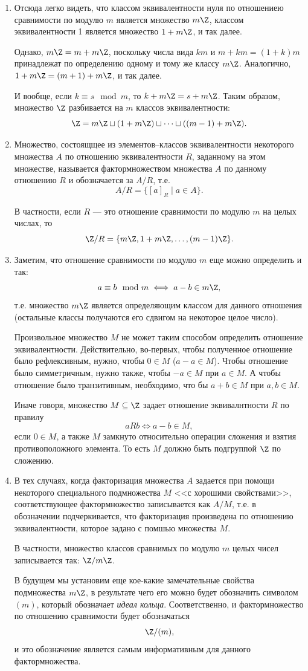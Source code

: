\begin{enumerate}
\item Отсюда легко видеть, что классом эквивалентности нуля по отношениею сравнимости по модулю $m$ является множество $m\Z$, классом эквивалентности 1 является множество $1+m\Z$, и так далее.

Однако, $m\Z=m+m\Z$, поскольку числа вида $km$ и $m+km=(1+k)m$ принадлежат по определению одному и тому же классу $m\Z$. Аналогично, $1+m\Z=(m+1)+m\Z$, и так далее.

И вообще, если $k\equiv s\mod m$, то $k+m\Z=s+m\Z$. Таким образом, множество $\Z$ разбивается на $m$ классов эквивалентности:
$$
\Z = m\Z \sqcup (1+m\Z) \sqcup\dots \sqcup ((m-1)+m\Z).
$$

\item Множество, состоящщее из элементов--классов эквивалентности некоторого множества $A$ по отношению эквивалентности $R$, заданному на этом множестве, называется фактормножеством множества $A$ по данному отношению $R$ и обозначается за $A/R$, т.е.
$$
A/R = \{[a]_R\mid a\in A\}.
$$

В частности, если $R$ --- это отношение сравнимости по модулю $m$ на целых числах, то
$$
\Z/R = \{m\Z, 1+m\Z,\dots,(m-1)\Z\}.
$$

\item Заметим, что отношение сравнимости по модулю $m$ еще можно определить и так:
$$
a\equiv b\mod m\iff a-b\in m\Z,
$$
т.е. множество $m\Z$ является определяющим классом для данного отношения (остальные классы получаются его сдвигом на некоторое целое число).

Произвольное множество $M$ не может таким способом определить отношение эквивалентности. Действительно, во-первых, чтобы полученное отношение было рефлексивным, нужно, чтобы $0\in M$ ($a-a\in M$). Чтобы отношение было симметричным, нужно также, чтобы $-a\in M$ при $a\in M$. А чтобы отношение было транзитивным, необходимо, что бы $a+b\in M$ при $a,b\in M$.

Иначе говоря, множество $M\subseteq \Z$ задает отношение эквивалнтности $R$ по правилу
$$
aRb\iff a-b\in M,
$$
если $0\in M$, а также $M$ замкнуто относительно операции сложения и взятия противоположного элемента. То есть $M$ должно быть подгруппой $\Z$ по сложению.

\item В тех случаях, когда факторизация множества $A$ задается при помощи некоторого специального подмножества $M$ <<с хорошими свойствами>>, соответствующее фактормножество записывается как $A/M$, т.е. в обозначении подчеркивается, что факторизация произведена по отношению эквивалентности, которое задано с помшью множества $M$.

В частности, множество классов сравнимых по модулю $m$ целых чисел записывается так: $\Z/m\Z$.

В будущем мы установим еще кое-какие замечательные свойства подмножества $m\Z$, в результате чего его можно будет обозначить символом $(m)$, который обозначает \textit{идеал кольца}. Соответственно, и фактормножество по отношению сравнимости будет обозначаться
$$
\Z/(m),
$$
и это обозначение является самым информативным для данного фактормножества.

\end{enumerate}


